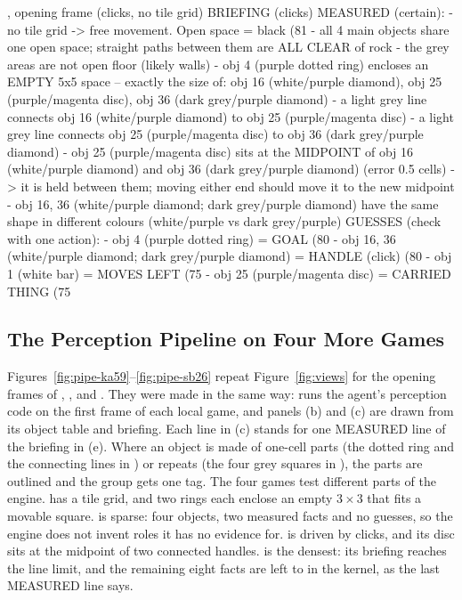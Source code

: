 \begin{briefing}{, opening frame (clicks, no tile grid)}
BRIEFING (clicks)
MEASURED (certain):
- no tile grid -> free movement. Open space = black (81%
- all 4 main objects share one open space; straight paths between them are ALL CLEAR of rock
- the grey areas are not open floor (likely walls)
- obj 4 (purple dotted ring) encloses an EMPTY 5x5 space -- exactly the size of: obj 16 (white/purple diamond), obj 25 (purple/magenta disc), obj 36 (dark grey/purple diamond)
- a light grey line connects obj 16 (white/purple diamond) to obj 25 (purple/magenta disc)
- a light grey line connects obj 25 (purple/magenta disc) to obj 36 (dark grey/purple diamond)
- obj 25 (purple/magenta disc) sits at the MIDPOINT of obj 16 (white/purple diamond) and obj 36 (dark grey/purple diamond) (error 0.5 cells) -> it is held between them; moving either end should move it to the new midpoint
- obj 16, 36 (white/purple diamond; dark grey/purple diamond) have the same shape in different colours (white/purple vs dark grey/purple)
GUESSES (check with one action):
- obj 4 (purple dotted ring) = GOAL (80%
- obj 16, 36 (white/purple diamond; dark grey/purple diamond) = HANDLE (click) (80%
- obj 1 (white bar) = MOVES LEFT (75%
- obj 25 (purple/magenta disc) = CARRIED THING (75%
\end{briefing}

\subsection{The Perception Pipeline on Four More Games}
\label{app:pipelines}

Figures~\ref{fig:pipe-ka59}--\ref{fig:pipe-sb26} repeat Figure~\ref{fig:views} for the opening frames of , ,  and . They were made in the same way:  runs the agent's perception code on the first frame of each local game, and panels (b) and (c) are drawn from its object table and briefing. Each line in (c) stands for one MEASURED line of the briefing in (e). Where an object is made of one-cell parts (the dotted ring and the connecting lines in ) or repeats (the four grey squares in ), the parts are outlined and the group gets one tag. The four games test different parts of the engine.  has a tile grid, and two rings each enclose an empty $3{\times}3$ that fits a movable square.  is sparse: four objects, two measured facts and no guesses, so the engine does not invent roles it has no evidence for.  is driven by clicks, and its disc sits at the midpoint of two connected handles.  is the densest: its briefing reaches the line limit, and the remaining eight facts are left to  in the kernel, as the last MEASURED line says.

